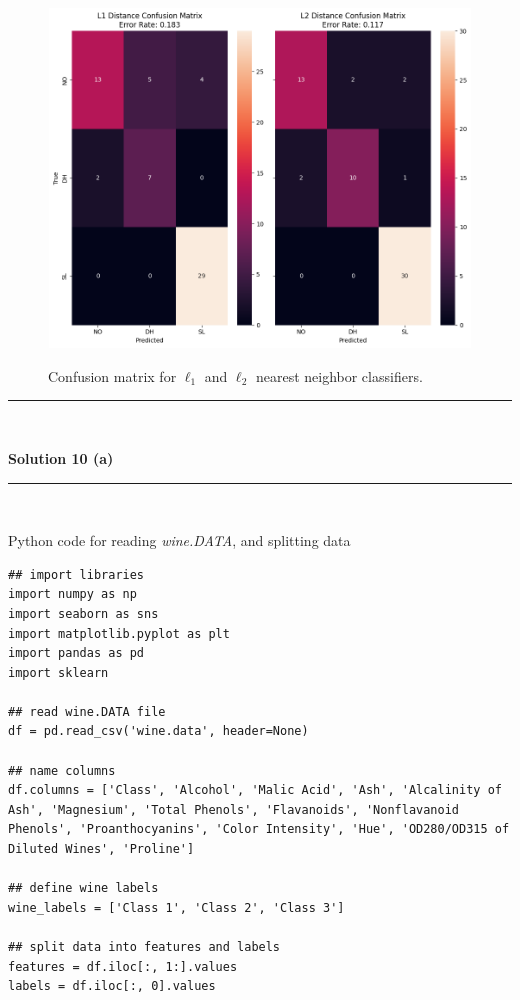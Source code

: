 \documentclass{article}
\begin{document}
\begin{figure}[H]
\includegraphics[width=15cm, height=9cm]{q9.png} \\
\caption{Confusion matrix for $\ell_1$ and $\ell_2$ nearest neighbor classifiers.}
\label{fig:image_comparison}
\end{figure} 
      
\noindent\rule{\textwidth}{0.4pt}\\

\newpage

\textbf{Solution 10 (a)}

\noindent\rule{\textwidth}{0.4pt}\\

\parbox{\textwidth}{Python code for reading \textit{wine.DATA}, and splitting data}

\begin{center}

\begin{lstlisting}
## import libraries
import numpy as np
import seaborn as sns
import matplotlib.pyplot as plt
import pandas as pd
import sklearn

## read wine.DATA file
df = pd.read_csv('wine.data', header=None)

## name columns
df.columns = ['Class', 'Alcohol', 'Malic Acid', 'Ash', 'Alcalinity of Ash', 'Magnesium', 'Total Phenols', 'Flavanoids', 'Nonflavanoid Phenols', 'Proanthocyanins', 'Color Intensity', 'Hue', 'OD280/OD315 of Diluted Wines', 'Proline']

## define wine labels
wine_labels = ['Class 1', 'Class 2', 'Class 3']

## split data into features and labels
features = df.iloc[:, 1:].values
labels = df.iloc[:, 0].values

\end{lstlisting}
    
\end{center}
\end{document}
